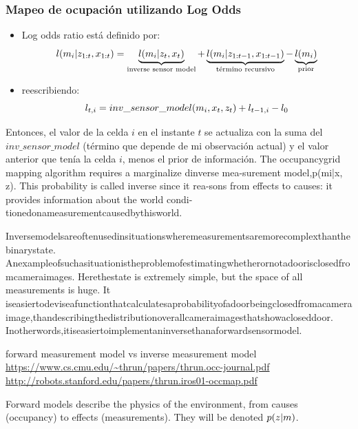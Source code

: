 \begin{frame}
    \frametitle{Mapeo de ocupación utilizando Log Odds}
    
    \begin{itemize}
        \item Log odds ratio está definido por:
        \begin{equation*}
            l(m_{i}| z_{1:t}, x_{1:t}) = \underbrace{l(m_{i}| z_{t}, x_{t})}_{\text{inverse sensor model}} + \underbrace{l(m_{i}| z_{1:t-1}, x_{1:t-1})}_{\text{término recursivo}} - \underbrace{l(m_{i})}_{\text{prior}}
        \end{equation*}
        \item reescribiendo:
        \begin{equation*}
            l_{t,i} = inv\_sensor\_model(m_{i}, x_{t}, z_{t}) + l_{t-1,i} - l_{0}
        \end{equation*}
    \end{itemize}
    
    Entonces, el valor de la celda $i$ en el instante $t$ se actualiza con la suma del $inv\_sensor\_model$ (término que depende de mi observación actual) y el valor anterior que tenía la celda $i$, menos el prior de información. The occupancygrid mapping algorithm requires a marginalize dinverse mea-surement model,p(mi|x, z). This probability is called inverse since it rea-sons from effects to causes: it provides information about the world condi-tionedonameasurementcausedbythisworld.
    
    Inversemodelsareoftenusedinsituationswheremeasurementsaremorecomplexthanthebinarystate. Anexampleofsuchasituationistheproblemofestimatingwhetherornotadoorisclosedfromcameraimages. Herethestate is extremely simple, but the space of all measurements is huge. It iseasiertodeviseafunctionthatcalculatesaprobabilityofadoorbeingclosedfromacameraimage,thandescribingthedistributionoverallcameraimagesthatshowacloseddoor. Inotherwords,itiseasiertoimplementaninversethanaforwardsensormodel.
    
    forward measurement model vs inverse measurement model
    \url{https://www.cs.cmu.edu/~thrun/papers/thrun.occ-journal.pdf}
    \url{http://robots.stanford.edu/papers/thrun.iros01-occmap.pdf}
    
    Forward models describe the physics of the environment, from causes (occupancy) to effects (measurements). They will be denoted $p(z | m)$.
    
\end{frame}


